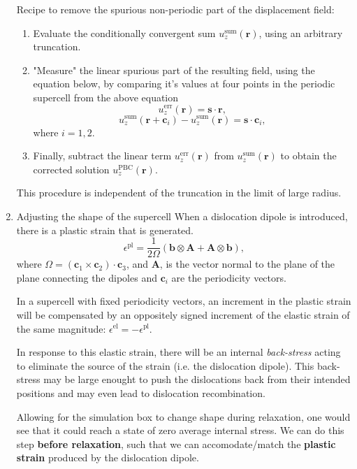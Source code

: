 \documentclass[11pt]{article}
\begin{document}
\begin{enumerate}
Recipe to remove the spurious non-periodic part of the displacement field:
\begin{enumerate}
\item Evaluate the conditionally convergent sum
$u_{z}^{\text{sum}}(\mathbf{r})$, using an arbitrary truncation.
\item "Measure" the linear spurious part of the resulting field, using the
equation below, by comparing it's values at four points in the
periodic supercell from the above equation 
\[ u_{z}^{\text{err}}(\mathbf{r}) =  \mathbf{s}\cdot\mathbf{r},  \]
\[ u_{z}^{\text{sum}}(\mathbf{r} + \mathbf{c}_{i})  -
        u_{z}^{\text{sum}}(\mathbf{r}) = \mathbf{s}\cdot\mathbf{c}_{i}, \]
where $i=1,2$.
\item Finally, subtract the linear term $u_{z}^{\text{err}}(\mathbf{r})$ from
$u_{z}^{\text{sum}}(\mathbf{r})$ to obtain the corrected solution
$u_{z}^{\text{PBC}}(\mathbf{r})$.
\end{enumerate}


This procedure is independent of the truncation in the limit of large
radius.

\item Adjusting the shape of the supercell
\label{sec-2-1-2-3}
When a dislocation dipole is introduced, there is a plastic strain that
is generated. 
\[ \epsilon^{\text{pl}} = \frac{1}{2\Omega}( \mathbf{b} \otimes
     \mathbf{A} + \mathbf{A} \otimes \mathbf{b} ), \]
where $\Omega = (\mathbf{c}_{1} \times \mathbf{c}_{2}) \cdot
     \mathbf{c}_{3}$, and $\mathbf{A}$, is the vector normal to the plane of
the plane connecting the dipoles and $\mathbf{c}_{i}$ are the periodicity vectors. 

In a supercell with fixed periodicity vectors, an increment in the
plastic strain will be compensated by an oppositely signed increment of
the elastic strain of the same magnitude: $\epsilon^{\text{el}} = -
     \epsilon^{\text{pl}}$.

In response to this elastic strain, there will be an internal
\emph{back-stress} acting to eliminate the source of the strain (i.e. the
dislocation dipole). This back-stress may be large enought to push the
dislocations back from their intended positions and may even lead to
dislocation recombination. 

Allowing for the simulation box to change shape during relaxation, one
would see that it could reach a state of zero average internal stress. 
We can do this step \textbf{before relaxation}, such that we can accomodate/match the
\textbf{plastic strain} produced by the dislocation dipole.


\end{enumerate}
\end{document}
